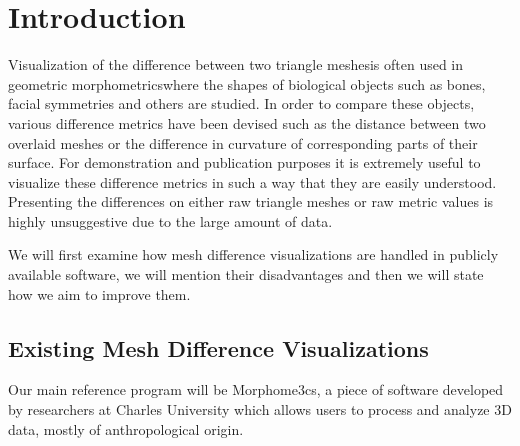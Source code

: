 \chapter*{Introduction}

Visualization of the difference between two triangle meshes\footnotemark is often used in geometric morphometrics\footnotemark where the shapes of biological objects such as bones, facial symmetries and others are studied. In order to compare these objects, various difference metrics have been devised such as the distance between two overlaid meshes or the difference in curvature of corresponding parts of their surface. For demonstration and publication purposes it is extremely useful to visualize these difference metrics in such a way that they are easily understood. Presenting the differences on either raw triangle meshes or raw metric values is highly unsuggestive due to the large amount of data\footnotemark.

\addtocounter{footnote}{-3}

We will first examine how mesh difference visualizations are handled in publicly available software, we will mention their disadvantages and then we will state how we aim to improve them.

\section*{Existing Mesh Difference Visualizations}
\label{sec:existing_visualizations}

Our main reference program will be Morphome3cs\footnotemark, a piece of software developed by researchers at Charles University which allows users to process and analyze 3D data, mostly of anthropological origin.


